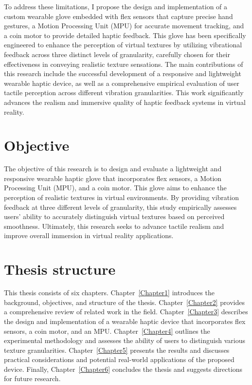 To address these limitations, I propose the design and implementation of a custom wearable glove embedded with flex sensors that capture precise hand gestures, a Motion Processing Unit (MPU) for accurate movement tracking, and a coin motor to provide detailed haptic feedback. This glove has been specifically engineered to enhance the perception of virtual textures by utilizing vibrational feedback across three distinct levels of granularity, carefully chosen for their effectiveness in conveying realistic texture sensations\cite{10.1145/3025453.3025812}. The main contributions of this research include the successful development of a responsive and lightweight wearable haptic device, as well as a comprehensive empirical evaluation of user tactile perception across different vibration granularities. This work significantly advances the realism and immersive quality of haptic feedback systems in virtual reality.


\section{Objective}

The objective of this research is to design and evaluate a lightweight and responsive wearable haptic glove that incorporates flex sensors, a Motion Processing Unit (MPU), and a coin motor. This glove aims to enhance the perception of realistic textures in virtual environments. By providing vibration feedback at three different levels of granularity, this study empirically assesses users' ability to accurately distinguish virtual textures based on perceived smoothness. Ultimately, this research seeks to advance tactile realism and improve overall immersion in virtual reality applications.

\section{Thesis structure}

This thesis consists of six chapters. Chapter~\ref{Chapter1}  introduces the background, objectives, and structure of the thesis. Chapter~\ref{Chapter2} provides a comprehensive review of related work in the field. Chapter~\ref{Chapter3} describes the design and implementation of a wearable haptic device that incorporates flex sensors, a coin motor, and an MPU. Chapter~\ref{Chapter4} outlines the experimental methodology and assesses the ability of users to distinguish various texture granularities. Chapter~\ref{Chapter5} presents the results and discusses practical considerations and potential real-world applications of the proposed device. Finally, Chapter~\ref{Chapter6} concludes the thesis and suggests directions for future research.



